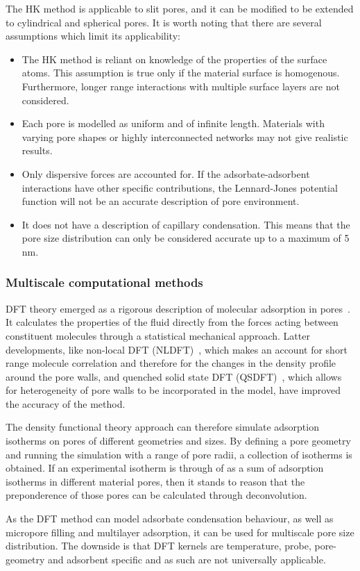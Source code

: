 The HK method is applicable to slit pores, and it can be modified to
be extended to cylindrical and spherical pores. It is worth noting
that there are several assumptions which limit its applicability:

\begin{itemize}

	\item The HK method is reliant on knowledge of the properties of
	      the surface atoms. This assumption is true only if the
	      material surface is homogenous. Furthermore,
	      longer range interactions with multiple surface layers are
	      not considered.
	\item Each pore is modelled as uniform and of infinite length.
	      Materials with varying pore shapes or highly interconnected
	      networks may not give realistic results.
	\item Only dispersive forces are accounted for.
	      If the adsorbate-adsorbent interactions
	      have other specific contributions, the Lennard-Jones
	      potential function will not be
	      an accurate description of pore environment.
	\item It does not have a description of capillary condensation.
	      This means that the pore size distribution can only
	      be considered accurate up to a maximum of 5 nm.

\end{itemize}

\subsubsection{Multiscale computational methods}

DFT theory emerged as a rigorous description of molecular
adsorption in pores~\cite{seatonNewAnalysisMethod1989}. 
It calculates the properties of the fluid
directly from the forces acting between constituent molecules
through a statistical mechanical approach. Latter developments,
like non-local DFT (NLDFT)~\cite{tarazonaPhaseEquilibriaFluid1987}, 
which makes an account for short range molecule correlation
and therefore for the changes in the density profile
around the pore walls, and quenched solid state DFT 
(QSDFT)~\cite{neimarkQuenchedSolidDensity2009}, which allows for 
heterogeneity of pore walls to be incorporated in the model,
have improved the accuracy of the method.

The density functional theory approach can therefore simulate 
adsorption isotherms on pores of different geometries and sizes. 
By defining a pore geometry and running the simulation with a 
range of pore radii, a collection of isotherms is obtained. 
If an experimental isotherm is through of as a sum of 
adsorption isotherms in different material pores, then it stands 
to reason that the preponderence of those pores can be calculated
through deconvolution.

As the DFT method can model adsorbate condensation behaviour,
as well as micropore filling and multilayer adsorption, it can 
be used for multiscale pore size distribution. The downside is
that DFT kernels are temperature, probe, pore-geometry and
adsorbent specific and as such are not universally applicable.
